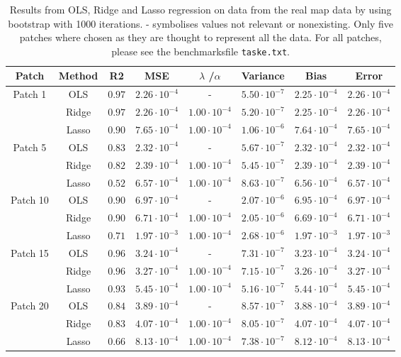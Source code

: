 \documentclass[12pt]{article}
\newcommand{\E}[1]{\cdot 10^{#1}}
\begin{document}
\begin{table}[H]
\centering
\begin{tabular}{c|c|c|c|c|c|c|c}
Patch & Method & R2 & MSE & $\lambda$ /$\alpha$ & Variance & Bias & Error \\ \hline
\multirow{3}{*}{Patch 1} & OLS & $0.97$ & $2.26\E{-4}$ & - & $5.50\E{-7}$ & $2.25\E{-4}$ & $2.26\E{-4}$ \\ \cline{2-8}
& Ridge & $0.97$ & $2.26\E{-4}$ & $1.00\E{-4}$ & $5.20\E{-7}$ & $2.25\E{-4}$ & $2.26\E{-4}$  \\ \cline{2-8}
& Lasso & $0.90$ & $7.65\E{-4}$ & $1.00\E{-4}$ & $1.06\E{-6}$ & $7.64\E{-4}$ & $7.65\E{-4}$\\ \hline
\multirow{3}{*}{Patch 5} & OLS & $0.83$ & $2.32\E{-4}$ & - & $5.67\E{-7}$ & $2.32\E{-4}$ & $2.32\E{-4}$  \\ \cline{2-8}
& Ridge & $0.82$ & $2.39\E{-4}$ & $1.00\E{-4}$ & $5.45\E{-7}$ & $2.39\E{-4}$ & $2.39\E{-4}$  \\ \cline{2-8}
& Lasso & $0.52$ & $6.57\E{-4}$ & $1.00\E{-4}$ & $8.63\E{-7}$ & $6.56\E{-4}$ & $6.57\E{-4}$ \\ \hline
\multirow{3}{*}{Patch 10} & OLS & $0.90$ & $6.97\E{-4}$ & - & $2.07\E{-6}$ & $6.95\E{-4}$ & $6.97\E{-4}$ \\ \cline{2-8}
& Ridge & $0.90$ & $6.71\E{-4}$ & $1.00\E{-4}$ & $2.05\E{-6}$ & $6.69\E{-4}$ & $6.71\E{-4}$ \\ \cline{2-8}
& Lasso & $0.71$ & $1.97\E{-3}$ & $1.00\E{-4}$ & $2.68\E{-6}$ & $1.97\E{-3}$ & $1.97\E{-3}$  \\ \hline
\multirow{3}{*}{Patch 15} & OLS & $0.96$ & $3.24\E{-4}$ & - & $7.31\E{-7}$ & $3.23\E{-4}$ & $3.24\E{-4}$ \\ \cline{2-8}
& Ridge & $0.96$ & $3.27\E{-4}$ & $1.00\E{-4}$ & $7.15\E{-7}$ & $3.26\E{-4}$ & $3.27\E{-4}$\\ \cline{2-8}
& Lasso & $0.93$ & $5.45\E{-4}$ & $1.00\E{-4}$ & $5.16\E{-7}$ & $5.44\E{-4}$ & $5.45\E{-4}$ \\ \hline
\multirow{3}{*}{Patch 20} & OLS & $0.84$ & $3.89\E{-4}$ & - & $8.57\E{-7}$ & $3.88\E{-4}$ & $3.89\E{-4}$ \\ \cline{2-8}
& Ridge & $0.83$ & $4.07\E{-4}$ & $1.00\E{-4}$ & $8.05\E{-7}$ & $4.07\E{-4}$ & $4.07\E{-4}$ \\ \cline{2-8}
& Lasso & $0.66$ & $8.13\E{-4}$ & $1.00\E{-4}$ & $7.38\E{-7}$ & $8.12\E{-4}$ & $8.13\E{-4}$ \\ \hline
\end{tabular}
\caption{Results from OLS, Ridge and Lasso regression on data from the real map data by using bootstrap with 1000 iterations. - symbolises values not relevant or nonexisting. Only five patches where chosen as they are thought to represent all the data. For all patches, please see the benchmarksfile \texttt{taske.txt}.}
\label{tabRD:e}
\end{table}
\end{document}
